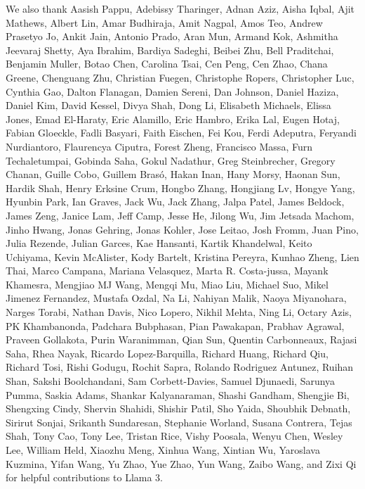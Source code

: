We also thank Aasish Pappu, Adebissy Tharinger, Adnan Aziz, Aisha Iqbal, Ajit Mathews, Albert Lin, Amar Budhiraja, Amit Nagpal, Amos Teo, Andrew Prasetyo Jo, Ankit Jain, Antonio Prado, Aran Mun, Armand Kok, Ashmitha Jeevaraj Shetty, Aya Ibrahim, Bardiya Sadeghi, Beibei Zhu, Bell Praditchai, Benjamin Muller, Botao Chen, Carolina Tsai, Cen Peng, Cen Zhao, Chana Greene, Chenguang Zhu, Christian Fuegen, Christophe Ropers, Christopher Luc, Cynthia Gao, Dalton Flanagan, Damien Sereni, Dan Johnson, Daniel Haziza, Daniel Kim, David Kessel, Divya Shah, Dong Li, Elisabeth Michaels, Elissa Jones, Emad El-Haraty, Eric Alamillo, Eric Hambro, Erika Lal, Eugen Hotaj, Fabian Gloeckle, Fadli Basyari, Faith Eischen, Fei Kou, Ferdi Adeputra, Feryandi Nurdiantoro, Flaurencya Ciputra, Forest Zheng, Francisco Massa, Furn Techaletumpai, Gobinda Saha, Gokul Nadathur, Greg Steinbrecher, Gregory Chanan, Guille Cobo, Guillem Brasó, Hakan Inan, Hany Morsy, Haonan Sun, Hardik Shah, Henry Erksine Crum, Hongbo Zhang, Hongjiang Lv, Hongye Yang, Hyunbin Park, Ian Graves, Jack Wu, Jack Zhang, Jalpa Patel, James Beldock, James Zeng, Janice Lam, Jeff Camp, Jesse He, Jilong Wu, Jim Jetsada Machom, Jinho Hwang, Jonas Gehring, Jonas Kohler, Jose Leitao, Josh Fromm, Juan Pino, Julia Rezende, Julian Garces, Kae Hansanti, Kartik Khandelwal, Keito Uchiyama, Kevin McAlister, Kody Bartelt, Kristina Pereyra, Kunhao Zheng, Lien Thai, Marco Campana, Mariana Velasquez, Marta R. Costa-jussa, Mayank Khamesra, Mengjiao MJ Wang, Mengqi Mu, Miao Liu, Michael Suo, Mikel Jimenez Fernandez, Mustafa Ozdal, Na Li, Nahiyan Malik, Naoya Miyanohara, Narges Torabi, Nathan Davis, Nico Lopero, Nikhil Mehta, Ning Li, Octary Azis, PK Khambanonda, Padchara Bubphasan, Pian Pawakapan, Prabhav Agrawal, Praveen Gollakota, Purin Waranimman, Qian Sun, Quentin Carbonneaux, Rajasi Saha, Rhea Nayak, Ricardo Lopez-Barquilla, Richard Huang, Richard Qiu, Richard Tosi, Rishi Godugu, Rochit Sapra, Rolando Rodriguez Antunez, Ruihan Shan, Sakshi Boolchandani, Sam Corbett-Davies, Samuel Djunaedi, Sarunya Pumma, Saskia Adams, Shankar Kalyanaraman, Shashi Gandham, Shengjie Bi, Shengxing Cindy, Shervin Shahidi, Shishir Patil, Sho Yaida, Shoubhik Debnath, Sirirut Sonjai, Srikanth Sundaresan, Stephanie Worland, Susana Contrera, Tejas Shah, Tony Cao, Tony Lee, Tristan Rice, Vishy Poosala, Wenyu Chen, Wesley Lee, William Held, Xiaozhu Meng, Xinhua Wang, Xintian Wu, Yaroslava Kuzmina, Yifan Wang, Yu Zhao, Yue Zhao, Yun Wang, Zaibo Wang, and Zixi Qi for helpful contributions to Llama 3.

